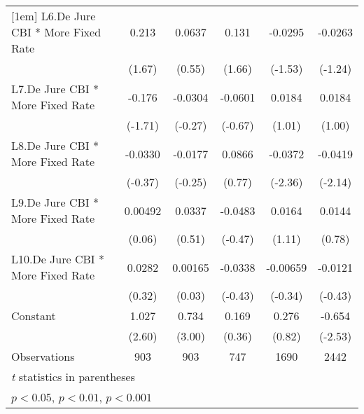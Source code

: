 {\begin{longtable}{l*{5}{c}}
[1em]
L6.De Jure CBI * More Fixed Rate&    0.213         &   0.0637         &    0.131         &  -0.0295         &  -0.0263         \\
                &   (1.67)         &   (0.55)         &   (1.66)         &  (-1.53)         &  (-1.24)         \\
[1em]
L7.De Jure CBI * More Fixed Rate&   -0.176         &  -0.0304         &  -0.0601         &   0.0184         &   0.0184         \\
                &  (-1.71)         &  (-0.27)         &  (-0.67)         &   (1.01)         &   (1.00)         \\
[1em]
L8.De Jure CBI * More Fixed Rate&  -0.0330         &  -0.0177         &   0.0866         &  -0.0372\sym{*}  &  -0.0419\sym{*}  \\
                &  (-0.37)         &  (-0.25)         &   (0.77)         &  (-2.36)         &  (-2.14)         \\
[1em]
L9.De Jure CBI * More Fixed Rate&  0.00492         &   0.0337         &  -0.0483         &   0.0164         &   0.0144         \\
                &   (0.06)         &   (0.51)         &  (-0.47)         &   (1.11)         &   (0.78)         \\
[1em]
L10.De Jure CBI * More Fixed Rate&   0.0282         &  0.00165         &  -0.0338         & -0.00659         &  -0.0121         \\
                &   (0.32)         &   (0.03)         &  (-0.43)         &  (-0.34)         &  (-0.43)         \\
[1em]
Constant        &    1.027\sym{*}  &    0.734\sym{**} &    0.169         &    0.276         &   -0.654\sym{*}  \\
                &   (2.60)         &   (3.00)         &   (0.36)         &   (0.82)         &  (-2.53)         \\
\hline
Observations    &      903         &      903         &      747         &     1690         &     2442         \\
\hline\hline
\multicolumn{6}{l}{\footnotesize \textit{t} statistics in parentheses}\\
\multicolumn{6}{l}{\footnotesize \sym{*} \(p<0.05\), \sym{**} \(p<0.01\), \sym{***} \(p<0.001\)}\\
\end{longtable}
}
